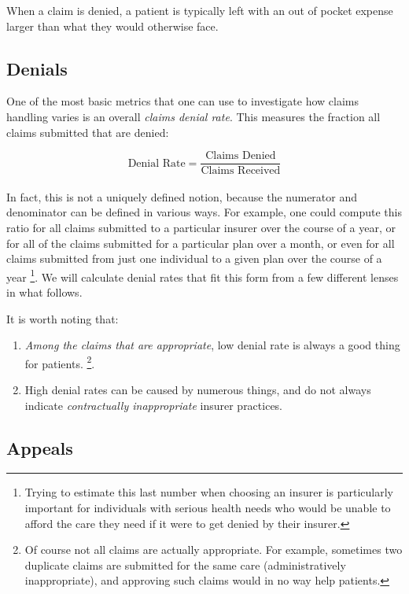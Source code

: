 \documentclass[12pt, a4paper,twoside,parskip=full]{report}
\theoremstyle{plain} %
\theoremstyle{definition} %
\theoremstyle{remark} %
\numberwithin{equation}{chapter}
\begin{document}
		When a claim is denied, a patient is typically left with an out of pocket expense larger than what they would otherwise face.

		\subsection{Denials}
		
		One of the most basic metrics that one can use to investigate how claims handling varies is an overall \emph{claims denial rate}. This measures the fraction all claims submitted that are denied:
		
		\begin{equation*}
			\text{Denial Rate} = \dfrac{\text{Claims Denied}}{\text{Claims Received}}
		\end{equation*}
		\hfill\\
		In fact, this is not a uniquely defined notion, because the numerator and denominator can be defined in various ways. For example, one could compute this ratio for all claims submitted to a particular insurer over the course of a year, or for all of the claims submitted for a particular plan over a month, or even for all claims submitted from just one individual to a given plan over the course of a year \footnote{Trying to estimate this last number when choosing an insurer is particularly important for individuals with serious health needs who would be unable to afford the care they need if it were to get denied by their insurer.}. We will calculate denial rates that fit this form from a few different lenses in what follows.
		
		It is worth noting that:
		
		\begin{enumerate}
			\item \emph{Among the claims that are appropriate}, low denial rate is always a good thing for patients. \footnote{Of course not all claims are actually appropriate. For example, sometimes two duplicate claims are submitted for the same care (administratively inappropriate), and approving such claims would in no way help patients. }.
			\item High denial rates can be caused by numerous things, and do not always indicate \emph{contractually inappropriate} insurer practices.
		\end{enumerate}
		
		
		\subsection{Appeals}
		
\end{document}
